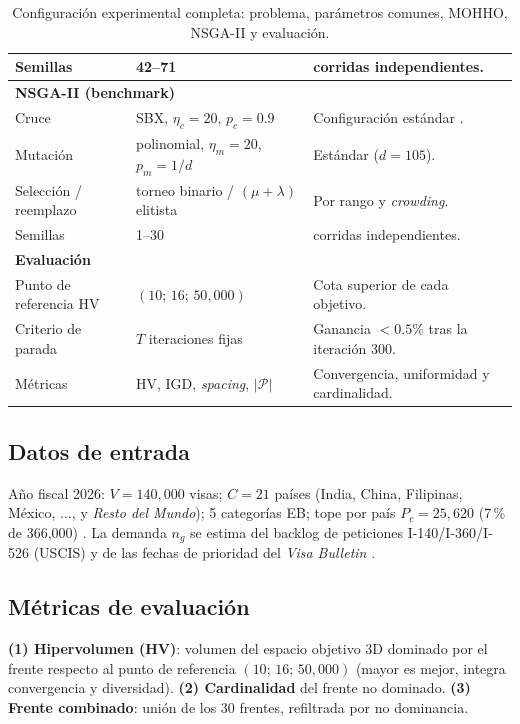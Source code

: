 \documentclass[11pt,letterpaper]{article}
\begin{document}
\begin{table}[H]
\begin{tabular}{l l >{\raggedright\arraybackslash}p{6.1cm}}
Semillas & 42--71 & 30 corridas independientes.\\
\midrule
\multicolumn{3}{l}{\cellcolor{alertred!12}\textbf{NSGA-II (benchmark)}}\\
Cruce & SBX, $\eta_c=20$, $p_c=0.9$ & Configuración estándar \parencite{deb2002}.\\
Mutación & polinomial, $\eta_m=20$, $p_m=1/d$ & Estándar ($d=105$).\\
Selección / reemplazo & torneo binario / $(\mu+\lambda)$ elitista & Por rango y \textit{crowding}.\\
Semillas & 1--30 & 30 corridas independientes.\\
\midrule
\multicolumn{3}{l}{\cellcolor{headerblue!14}\textbf{Evaluación}}\\
Punto de referencia HV & $(10;\,16;\,50{,}000)$ & Cota superior de cada objetivo.\\
Criterio de parada & $T$ iteraciones fijas & Ganancia $<0.5\%$ tras la iteración 300.\\
Métricas & HV, IGD, \textit{spacing}, $|\mathcal{P}|$ & Convergencia, uniformidad y cardinalidad.\\
\bottomrule
\end{tabular}
\caption{Configuración experimental completa: problema, parámetros comunes, MOHHO, NSGA-II y evaluación.}
\label{tab:params}
\end{table}

\subsection{Datos de entrada}
Año fiscal 2026: $V=140{,}000$ visas; $C=21$ países (India, China, Filipinas, México, $\dots$, y \textit{Resto del Mundo}); 5 categorías EB; tope por país $P_c=25{,}620$ (7\,\% de 366{,}000) \parencite{crs2023}. La demanda $n_g$ se estima del backlog de peticiones I-140/I-360/I-526 (USCIS) y de las fechas de prioridad del \textit{Visa Bulletin} \parencite{dosfeb2026,uscis2023}.

\subsection{Métricas de evaluación}
\textbf{(1) Hipervolumen (HV)}: volumen del espacio objetivo 3D dominado por el frente respecto al punto de referencia $(10;\,16;\,50{,}000)$ (mayor es mejor, integra convergencia y diversidad). \textbf{(2) Cardinalidad} del frente no dominado. \textbf{(3) Frente combinado}: unión de los 30 frentes, refiltrada por no dominancia.
\end{document}
